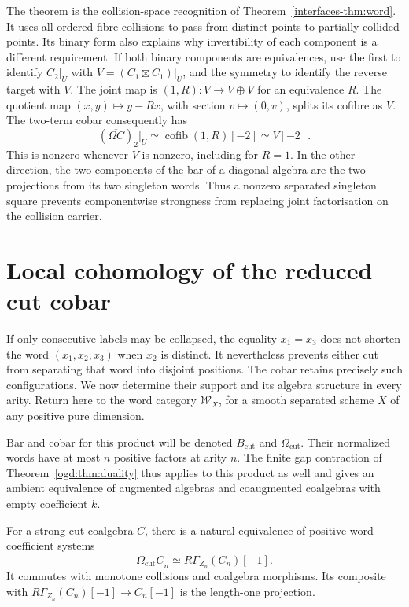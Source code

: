The theorem is the collision-space recognition of
Theorem~\ref{interfaces-thm:word}. It uses all ordered-fibre collisions
to pass from distinct points to partially collided points.
Its\label{ogd:def:binary-joint-graph-map} binary form also explains why invertibility of each component is a
different requirement. If both binary components are equivalences, use
the first to identify $C_2|_U$ with
$V=(C_1\boxtimes C_1)|_U$, and the symmetry to identify the reverse target
with $V$. The joint map is $(1,R):V\to V\oplus V$ for an equivalence $R$.
The quotient map $(x,y)\mapsto y-Rx$, with section $v\mapsto(0,v)$,
splits its cofibre as $V$. The two-term cobar consequently has
\begin{equation}\label{ogd:eq:strong-graph}
 (\overline{\Omega C})_2|_U
   \simeq\operatorname{cofib}(1,R)[-2]\simeq V[-2].
\end{equation}
This is nonzero whenever $V$ is nonzero, including for $R=1$.
In the other direction, the two components of the bar of a diagonal
algebra are the two projections from its two singleton words. Thus a
nonzero separated singleton square prevents componentwise strongness
from replacing joint factorisation on the collision carrier.

\section{Local cohomology of the reduced cut cobar}
\label{ogd:sec:cut-cobar-support}

If only consecutive labels may be collapsed, the equality $x_1=x_3$
does not shorten the word $(x_1,x_2,x_3)$ when $x_2$ is distinct.
It nevertheless prevents either cut from separating that word into
disjoint positions. The cobar retains precisely such configurations.
We now determine their support and its algebra structure in every arity.
Return here to the word category $\mathcal W_X$, for a smooth separated
scheme $X$ of any positive pure dimension.

Bar and cobar for this product will be denoted $B_{\mathrm{cut}}$ and
$\Omega_{\mathrm{cut}}$. Their normalized words have at most $n$ positive
factors at arity $n$. The finite gap contraction of
Theorem~\ref{ogd:thm:duality} thus applies to this product as well and gives
an ambient equivalence of augmented algebras and coaugmented coalgebras
with empty coefficient $k$.

\begin{theorem}\label{ogd:thm:cut-local-cohomology}
For a strong cut coalgebra $C$, there is a natural equivalence of positive
word coefficient systems
\begin{equation}\label{ogd:eq:cut-local-cohomology}
 \overline{\Omega_{\mathrm{cut}}C}_n
       \simeq R\Gamma_{Z_n}(C_n)[-1].
\end{equation}
It commutes with monotone collisions and coalgebra morphisms. Its composite
with $R\Gamma_{Z_n}(C_n)[-1]\to C_n[-1]$ is the length-one projection.
\end{theorem}

